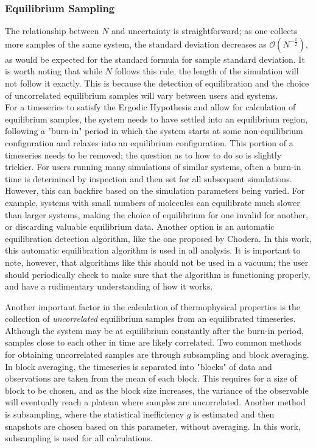 \documentclass[9pt,bestpractices]{livecoms}
\begin{document}
\subsubsection{Equilibrium Sampling}
The relationship between $N$ and uncertainty is straightforward; as one collects more samples of the same system, the standard deviation decreases as $\mathcal{O} (N^{-\frac{1}{2}})$, as would be expected for the standard formula for sample standard deviation.  It is worth noting that while $N$ follows this rule, the length of the simulation will not follow it exactly.  This is because the detection of equilibration and the choice of uncorrelated equilibrium samples will vary between users and systems.  
\\
For a timeseries to satisfy the Ergodic Hypothesis and allow for calculation of equilibrium samples, the system needs to have settled into an equilibrium region, following a "burn-in" period in which the system starts at some non-equilibrium configuration and relaxes into an equilibrium configuration.  This portion of a timeseries needs to be removed; the question as to how to do so is slightly trickier.  For users running many simulations of similar systems, often a burn-in time is determined by inspection and then set for all subsequent simulations. However, this can backfire based on the simulation parameters being varied.  For example, systems with small numbers of molecules can equilibrate much slower than larger systems, making the choice of equilibrium for one invalid for another, or discarding valuable equilibrium data.  Another option is an automatic equilibration detection algorithm, like the one proposed by Chodera. %
In this work, this automatic equilibration algorithm is used in all analysis.  It is important to note, however, that algorithms like this should not be used in a vacuum;  the user should periodically check to make sure that the algorithm is functioning properly, and have a rudimentary understanding of how it works.

Another important factor in the calculation of thermophysical properties is the collection of \emph{uncorrelated} equilibrium samples from an equilibrated timeseries.  Although the system may be at equilibrium constantly after the burn-in period, samples close to each other in time are likely correlated.  Two common methods for obtaining uncorrelated samples are through subsampling and block averaging.  In block averaging, the timeseries is separated into "blocks" of data and observations are taken from the mean of each block.  This requires for a size of block to be chosen, and as the block size increases, the variance of the observable will eventually reach a plateau where samples are uncorrelated.  Another method is subsampling, where the statistical inefficiency $g$ is estimated and then snapshots are chosen based on this parameter, without averaging.  In this work, subsampling is used for all calculations.
\end{document}
